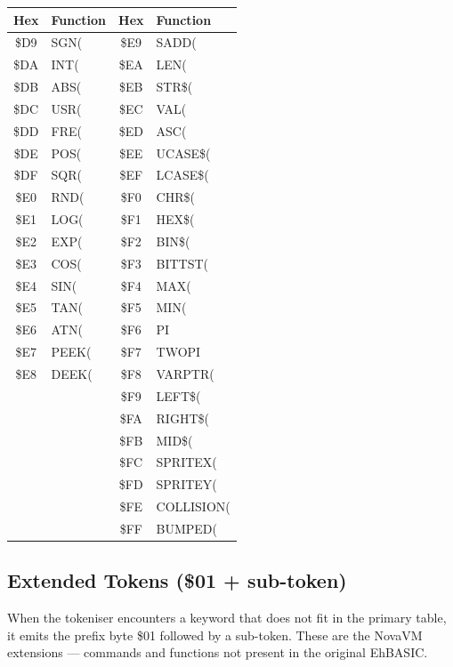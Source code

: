 \begin{center}
\begin{longtable}{cl|cl}
\toprule
\textbf{Hex} & \textbf{Function} &
\textbf{Hex} & \textbf{Function} \\
\midrule
\endhead
\$D9 & SGN(       & \$E9 & SADD(      \\
\$DA & INT(       & \$EA & LEN(       \\
\$DB & ABS(       & \$EB & STR\$(     \\
\$DC & USR(       & \$EC & VAL(       \\
\$DD & FRE(       & \$ED & ASC(       \\
\$DE & POS(       & \$EE & UCASE\$(   \\
\$DF & SQR(       & \$EF & LCASE\$(   \\
\$E0 & RND(       & \$F0 & CHR\$(     \\
\$E1 & LOG(       & \$F1 & HEX\$(     \\
\$E2 & EXP(       & \$F2 & BIN\$(     \\
\$E3 & COS(       & \$F3 & BITTST(    \\
\$E4 & SIN(       & \$F4 & MAX(       \\
\$E5 & TAN(       & \$F5 & MIN(       \\
\$E6 & ATN(       & \$F6 & PI         \\
\$E7 & PEEK(      & \$F7 & TWOPI      \\
\$E8 & DEEK(      & \$F8 & VARPTR(    \\
     &            & \$F9 & LEFT\$(    \\
     &            & \$FA & RIGHT\$(   \\
     &            & \$FB & MID\$(     \\
     &            & \$FC & SPRITEX(   \\
     &            & \$FD & SPRITEY(   \\
     &            & \$FE & COLLISION( \\
     &            & \$FF & BUMPED(    \\
\bottomrule
\end{longtable}
\end{center}

\subsection{Extended Tokens (\$01 + sub-token)}

When the tokeniser encounters a keyword that does not fit in the primary
table, it emits the prefix byte \$01 followed by a sub-token.  These are the
NovaVM extensions --- commands and functions not present in the original
EhBASIC.


